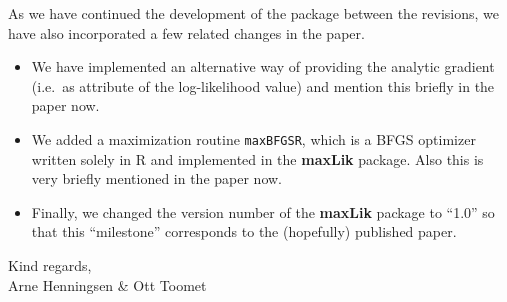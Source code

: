 \documentclass[12pt,parskip=half]{scrartcl}
\newcommand{\code}[1]{\texttt{#1}}
\newcommand{\pkg}[1]{\textbf{#1}}
\newcommand{\proglang}[1]{\textsf{#1}}
\begin{document}
As we have continued the development of the package between the
revisions, we have also incorporated a few related changes in the paper.
\begin{itemize}
\item We have implemented an alternative way of providing the analytic gradient
(i.e.\ as attribute of the log-likelihood value) and
mention this briefly in the paper now.
\item We added a maximization routine \code{maxBFGSR}, which is a BFGS optimizer
written solely in \proglang{R} and implemented in the \pkg{maxLik} package.
Also this is very briefly mentioned in the paper now.
\item 
Finally, we changed the version number of the \pkg{maxLik} package to ``1.0''
so that this ``milestone'' corresponds to the (hopefully) published paper.
\end{itemize}

\vspace{5mm}

Kind regards,\\
Arne Henningsen \& Ott Toomet
\end{document}
